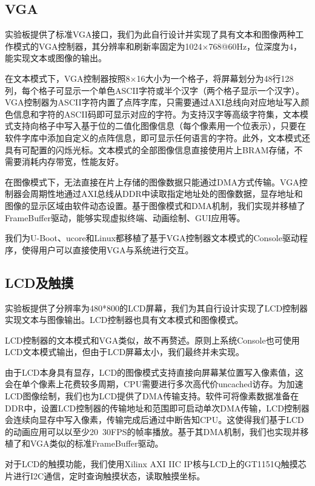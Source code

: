 \subsection{VGA}

实验板提供了标准VGA接口，我们为此自行设计并实现了具有文本和图像两种工作模式的VGA控制器，其分辨率和刷新率固定为1024×768@60Hz，位深度为4，能实现文本或图像的输出。

在文本模式下，VGA控制器按照8×16大小为一个格子，将屏幕划分为48行128列，每个格子可显示一个单色ASCII字符或半个汉字（两个格子显示一个汉字）。VGA控制器为ASCII字符内置了点阵字库，只需要通过AXI总线向对应地址写入颜色信息和字符的ASCII码即可显示对应的字符。为支持汉字等高级字符集，文本模式支持向格子中写入基于位的二值化图像信息（每个像素用一个位表示），只要在软件字库中添加自定义的点阵信息，即可显示任何语言的字符。此外，文本模式还具有可配置的闪烁光标。文本模式的全部图像信息直接使用片上BRAM存储，不需要消耗内存带宽，性能友好。

在图像模式下，无法直接在片上存储的图像数据只能通过DMA方式传输。VGA控制器会周期性地通过AXI总线从DDR中读取指定地址处的图像数据，显存地址和图像的显示区域由软件动态设置。基于图像模式和DMA机制，我们实现并移植了FrameBuffer驱动，能够实现虚拟终端、动画绘制、GUI应用等。

我们为U-Boot、ucore和Linux都移植了基于VGA控制器文本模式的Console驱动程序，使得用户可以直接使用VGA与系统进行交互。

\subsection{LCD及触摸}

实验板提供了分辨率为480*800的LCD屏幕，我们为其自行设计实现了LCD控制器实现文本与图像输出。LCD控制器也具有文本模式和图像模式。

LCD控制器的文本模式和VGA类似，故不再赘述。原则上系统Console也可使用LCD文本模式输出，但由于LCD屏幕太小，我们最终并未实现。

由于LCD本身具有显存，LCD的图像模式支持直接向屏幕某位置写入像素值，这会在单个像素上花费较多周期，CPU需要进行多次高代价uncached访存。为加速LCD图像绘制，我们也为LCD提供了DMA传输支持。软件可将像素数据准备在DDR中，设置LCD控制器的传输地址和范围即可启动单次DMA传输，LCD控制器会连续向显存中写入像素，传输完成后通过中断告知CPU。这使得我们基于LCD的动画应用可以以至少20~30FPS的帧率播放。基于其DMA机制，我们也实现并移植了和VGA类似的标准FrameBuffer驱动。

对于LCD的触摸功能，我们使用Xilinx AXI IIC IP核与LCD上的GT1151Q触摸芯片进行I2C通信，定时查询触摸状态，读取触摸坐标。

